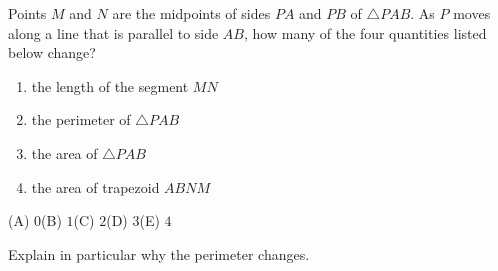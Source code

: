 Points $M$ and $N$ are the midpoints of sides $PA$ and $PB$ of $\triangle PAB$. As $P$ moves along a line that is parallel to side $AB$, how many of the four quantities listed below change?
\begin{enumerate}
\item[(a)] the length of the segment $MN$
\item[(b)] the perimeter of $\triangle PAB$
\item[(c)] the area of $\triangle PAB$
\item[(d)] the area of trapezoid $ABNM$
\end{enumerate}
(A) $0$\qquad (B) $1$\qquad (C) $2$\qquad (D) $3$\qquad (E) $4$

Explain in particular why the perimeter changes.

